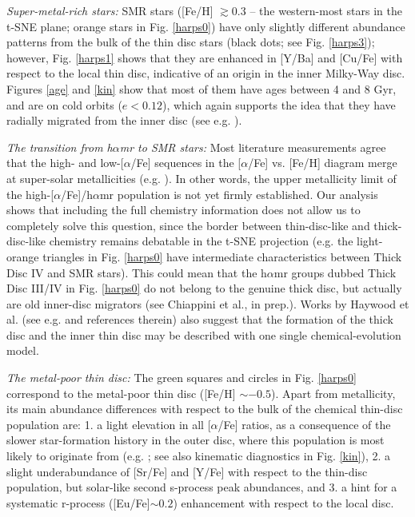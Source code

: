 \documentclass{aa}  %
\begin{document}
{\it Super-metal-rich stars:} SMR stars ([Fe/H] $\gtrsim0.3$ -- the western-most stars in the t-SNE plane; orange stars in Fig. \ref{harps0}) have only slightly different abundance patterns from the bulk of the thin disc stars (black dots; see Fig. \ref{harps3}); however, Fig. \ref{harps1} shows that they are enhanced in [Y/Ba] and [Cu/Fe] with respect to the local thin disc, indicative of an origin in the inner Milky-Way disc. Figures \ref{age} and \ref{kin} show that most of them have ages between 4 and 8 Gyr, and are on cold orbits ($e<0.12$), which again supports the idea that they have radially migrated from the inner disc (see e.g. \citealt{Casagrande2011, Minchev2012, Vera-Ciro2014, Kordopatis2015, Grand2016, Anders2017}).

{\it The transition from h$\alpha$mr to SMR stars:} Most literature measurements agree that the high- and low-[$\alpha$/Fe] sequences in the [$\alpha$/Fe] vs. [Fe/H] diagram merge at super-solar metallicities (e.g. \citealt{Adibekyan2011, Anders2014, Hayden2015}). In other words, the upper metallicity limit of the high-[$\alpha$/Fe]/h$\alpha$mr population is not yet firmly established. Our analysis shows that including the full chemistry information does not allow us to completely solve this question, since the border between thin-disc-like and thick-disc-like chemistry remains debatable in the t-SNE projection (e.g. the light-orange triangles in Fig. \ref{harps0} have intermediate characteristics between Thick Disc IV and SMR stars). This could mean that the h$\alpha$mr groups dubbed Thick Disc III/IV in Fig. \ref{harps0} do not belong to the genuine thick disc, but actually are old inner-disc migrators (see Chiappini et al., in prep.). Works by Haywood et al. (see e.g. \citealt{Haywood2018} and references therein) also suggest that the formation of the thick disc and the inner thin disc may be described with one single chemical-evolution model. 

{\it The metal-poor thin disc:} The green squares and circles in Fig. \ref{harps0} correspond to the metal-poor thin disc ([Fe/H] $\sim-0.5$). Apart from metallicity, its main abundance differences with respect to the bulk of the chemical thin-disc population are: 1. a light elevation in all [$\alpha$/Fe] ratios, as a consequence of the slower star-formation history in the outer disc, where this population is most likely to originate from (e.g. \citealt{Nordstroem2004, Anders2014, Hayden2015}; see also kinematic diagnostics in Fig. \ref{kin}), 2. a slight underabundance of [Sr/Fe] and [Y/Fe] with respect to the thin-disc population, but solar-like second s-process peak abundances, and 3. 
a hint for a systematic r-process ([Eu/Fe]$\sim0.2$) enhancement with respect to the local disc.
\end{document}
